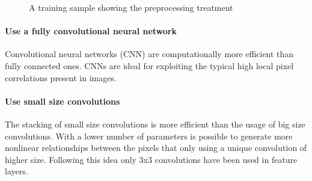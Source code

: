 \documentclass[review]{elsarticle}
\theoremstyle{definition} %
\theoremstyle{remark}
\begin{document}
\begin{figure}[h]
	\centering
	\caption{A training sample showing the preprocessing treatment}
	\label{fig:preprocessing}
\end{figure}

\paragraph{Use a fully convolutional neural network} Convolutional neural networks (CNN) are computationally more efficient than fully connected ones. CNNs are ideal for exploiting the typical high local pixel correlations present in images.

\paragraph{Use small size convolutions} The stacking of small size convolutions is more efficient than the usage of big size convolutions. With a lower number of parameters is possible to generate more nonlinear relationships between the pixels that only using a unique convolution of higher size. Following this idea only 3x3 convolutions have been used in feature layers. 
\end{document}
